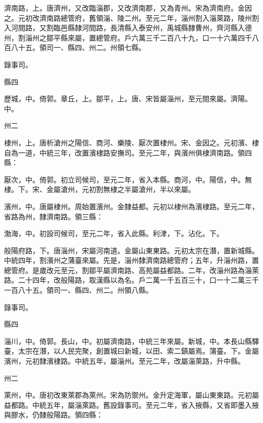 \begin{pinyinscope}
 濟南路，上。唐濟州，又改臨淄郡，又改濟南郡，又為青州。宋為濟南府。金因之。元初改濟南路總管府，舊領淄、陵二州。至元二年，淄州割入淄萊路，陵州割入河間路，又割臨邑縣隸河間路，長清縣入泰安州，禹城縣隸曹州，齊河縣入德州，割淄州之鄒平縣來屬，置總管府。戶六萬三千二百八十九，口一十六萬四千八百八十五。領司一、縣四、州二。州領七縣。



 錄事司。



 縣四



 歷城，中。倚郭。章丘，上。鄒平，上。唐、宋皆屬淄州，至元間來屬。濟陽。中。



 州二



 棣州，上。唐析滄州之陽信、商河、樂陵、厭次置棣州。宋、金因之。元初濱、棣自為一道，中統三年，改置濱棣路安撫司。至元二年，與濱州俱棣濟南路。領四縣：



 厭次，中。倚郭。初立司候司，至元二年，省入本縣。商河，中。陽信，中。無棣。下。宋、金屬滄州，元初割無棣之半屬滄州，半以來屬。



 濱州，中。唐屬棣州。周始置濱州。金隸益都。元初以棣州為濱棣路。至元二年，省路為州，隸濟南路。領三縣：



 渤海，中。初設司候司，至元二年，省入此縣。利津，下。沾化。下。



 般陽府路，下。唐淄州，宋屬河南道。金屬山東東路。元初太宗在潛，置新城縣。中統四年，割濱州之蒲臺來屬。先是，淄州隸濟南路總管府；五年，升淄州路，置總管府。是歲改元至元，割鄒平屬濟南路、高苑屬益都路。二年，改淄州路為淄萊路。二十四年，改般陽路，取漢縣以為名。戶二萬一千五百三十，口一十二萬三千一百八十五。領司一、縣四、州二。州領八縣。



 錄事司。



 縣四



 淄川，中。倚郭。長山，中。初屬濟南路，中統三年來屬。新城，中。本長山縣驛臺，太宗在潛，以人民完聚，創置城曰新城，以田、索二鎮屬焉。蒲臺。下。金屬濱州，元初隸濱棣路。中統五年，屬淄州。至元二年，改屬淄萊路，升中縣。



 州二



 萊州，中。唐初改東萊郡為萊州。宋為防禦州。金升定海軍，屬山東東路。元初屬益都路。中統五年，屬淄萊路。舊設錄事司。至元二年，省入掖縣，又省即墨入掖與膠水，仍隸般陽路。領四縣：




\end{pinyinscope}
